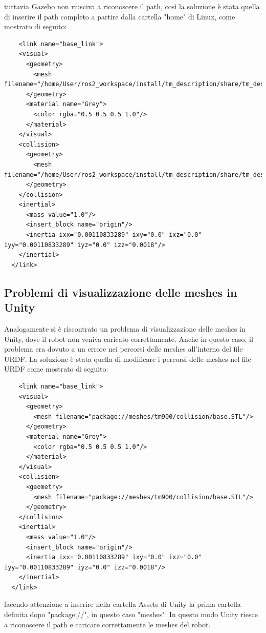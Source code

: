 \documentclass[11pt]{report}
\begin{document}
tuttavia Gazebo non riusciva a riconoscere il path, così la soluzione è stata quella di inserire il path completo a partire dalla cartella "home" di Linux, come mostrato di seguito:
\begin{verbatim}
    <link name="base_link">
    <visual>
      <geometry>
        <mesh filename="/home/User/ros2_workspace/install/tm_description/share/tm_description/meshes/tm900/visual/Base.STL"/>
      </geometry>
      <material name="Grey">
        <color rgba="0.5 0.5 0.5 1.0"/>
      </material>
    </visual>
    <collision>
      <geometry>
        <mesh filename="/home/User/ros2_workspace/install/tm_description/share/tm_description/meshes/tm900/collision/base.STL"/>
      </geometry>
    </collision>
    <inertial>
      <mass value="1.0"/>
      <insert_block name="origin"/>
      <inertia ixx="0.00110833289" ixy="0.0" ixz="0.0" iyy="0.00110833289" iyz="0.0" izz="0.0018"/>
    </inertial>
  </link>
\end{verbatim}
\subsection{Problemi di visualizzazione delle meshes in Unity}
Analogamente si è riscontrato un problema di visualizzazione delle meshes in Unity, dove il robot non veniva caricato correttamente. Anche in questo caso, il problema era dovuto a un errore nei percorsi delle meshes all'interno del file URDF. La soluzione è stata quella di modificare i percorsi delle meshes nel file URDF come mostrato di seguito:

\begin{verbatim}
    <link name="base_link">
    <visual>
      <geometry>
        <mesh filename="package://meshes/tm900/collision/base.STL"/>
      </geometry>
      <material name="Grey">
        <color rgba="0.5 0.5 0.5 1.0"/>
      </material>
    </visual>
    <collision>
      <geometry>
        <mesh filename="package://meshes/tm900/collision/base.STL"/>
      </geometry>
    </collision>
    <inertial>
      <mass value="1.0"/>
      <insert_block name="origin"/>
      <inertia ixx="0.00110833289" ixy="0.0" ixz="0.0" iyy="0.00110833289" iyz="0.0" izz="0.0018"/>
    </inertial>
  </link>
\end{verbatim}

facendo attenzione a inserire nella cartella Assets di Unity la prima cartella definita dopo "package://", in questo caso "meshes". In questo modo Unity riesce a riconoscere il path e caricare correttamente le meshes del robot.
\end{document}
